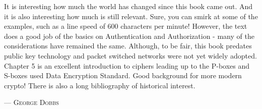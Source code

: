 It is interesting how much the world has changed since this book came out.
    And it is also interesting how much is still relevant.
    Sure, you can smirk at some of the examples, such as a line speed of 600 characters per minute!  However, the text does a good job of the basics on Authentication and Authorization - many of the considerations have remained the same. Although, to be fair, this book predates public key technology and packet switched networks were not yet widely adopted.
    Chapter 5 is an excellent introduction to ciphers leading up to the P-boxes and S-boxes used Data Encryption Standard.  Good background for more modern crypto!
    There is also a long bibliography of historical interest.
\setlength{\parindent}{0cm}\par\textsc{ --- George Dobbs }\par\vspace{12pt}\setlength{\parindent}{15pt}
